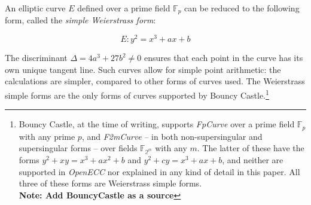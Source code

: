An elliptic curve \(E\) defined over a prime field \(\mathbb{F}_p\) can be reduced to the following form,
called the \emph{simple Weierstrass form}:

\begin{equation}
	E: y^2 = x^3 + ax + b
\end{equation}

The discriminant \(\Delta = 4a^3 + 27b^2 \neq 0\) ensures that each point in the curve has its own
unique tangent line. Such curves allow for simple point arithmetic: the
calculations are simpler, compared to other forms of curves used. The Weierstrass simple forms are
the only forms of curves supported by Bouncy Castle.\footnote{Bouncy Castle, at the time of writing,
supports \emph{FpCurve} over a prime field \(\mathbb{F}_p\) with any prime \(p\), and \emph{F2mCurve}
-- in both non-supersingular and supersingular forms -- over fields \(\mathbb{F_{2^m}}\) with any \(m\).
The latter of these have the forms \(y^2 + xy = x^3 + ax^2 + b\) and
\(y^2 + cy = x^3 + ax + b\), and neither are supported in \emph{OpenECC} nor explained in any kind
of detail in this paper. All three of these forms are Weierstrass simple forms.\\ \textbf{Note: Add BouncyCastle
as a source}}